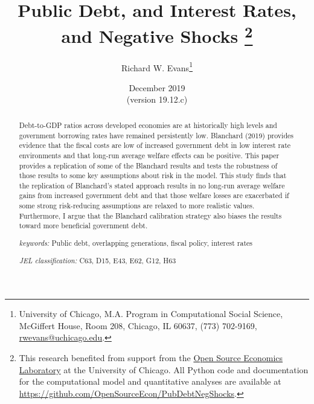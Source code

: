 \documentclass[letterpaper,12pt]{article}
\theoremstyle{definition}
\begin{document}
\begin{titlepage}
\title{Public Debt, and Interest Rates, and Negative Shocks \thanks{This research benefited from support from the \href{https://www.oselab.org/}{Open Source Economics Laboratory} at the University of Chicago. All Python code and documentation for the computational model and quantitative analyses are available at \href{https://github.com/OpenSourceEcon/PubDebtNegShocks}{https://github.com/OpenSourceEcon/PubDebtNegShocks}.}
}
\author{
  Richard W. Evans\footnote{University of Chicago, M.A. Program in Computational Social Science, McGiffert House, Room 208, Chicago, IL 60637, (773) 702-9169, \href{mailto:rwevans@uchicago.edu}{rwevans@uchicago.edu}.}
  }
\date{{\footnotesize{December 2019}} \\
  {\scriptsize{(version 19.12.c)}}}
\maketitle
\vspace{-9mm}
\begin{abstract}
  Debt-to-GDP ratios across developed economies are at historically high levels and government borrowing rates have remained persistently low. Blanchard (2019) provides evidence that the fiscal costs are low of increased government debt in low interest rate environments and that long-run average welfare effects can be positive. This paper provides a replication of some of the Blanchard results and tests the robustness of those results to some key assumptions about risk in the model. This study finds that the replication of Blanchard's stated approach results in no long-run average welfare gains from increased government debt and that those welfare losses are exacerbated if some strong risk-reducing assumptions are relaxed to more realistic values. Furthermore, I argue that the Blanchard calibration strategy also biases the results toward more beneficial government debt.
  \vspace{3mm}

  \noindent\textit{keywords:}\: Public debt, overlapping generations, fiscal policy, interest rates

  \vspace{3mm}

  \noindent\textit{JEL classification:} C63, D15, E43, E62, G12, H63

\end{abstract}
\thispagestyle{empty}
\end{titlepage}
\end{document}
